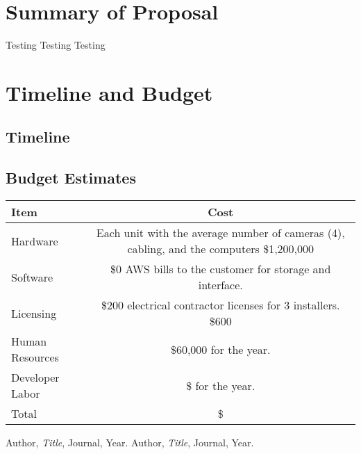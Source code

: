 \documentclass{report}
\begin{document}
\chapter{Summary of Proposal}
Testing Testing Testing

\chapter{Timeline and Budget}
\section{Timeline}

\section{Budget Estimates}
\begin{tabular}{|l|c|}
\hline
Item & Cost \\
\hline
Hardware & Each unit with the average number of cameras (4), cabling, and the computers \$1,200,000 \\
Software & \$0 AWS bills to the customer for storage and interface. \\
Licensing & \$200 electrical contractor licenses for 3 installers. \$600 \\
Human Resources & \$60,000 for the year. \\
Developer Labor & \$ for the year. \\
\hline
Total & \$ \\
\hline
\end{tabular}

\begin{thebibliography}{9}
 Author, \textit{Title}, Journal, Year.
 Author, \textit{Title}, Journal, Year.
\end{thebibliography}
\end{document}
